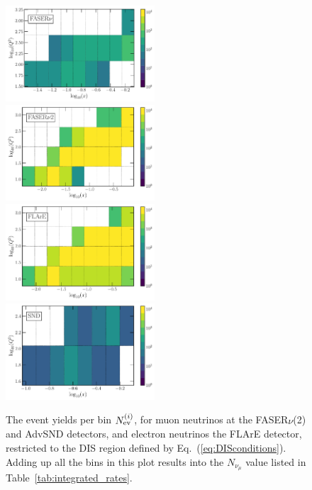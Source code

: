 \begin{figure}[t]
    \centering
	\includegraphics[width=0.495\textwidth]{plots/FPF-FASERv.pdf}
	\includegraphics[width=0.495\textwidth]{plots/FPF-FASERv2.pdf}
	\includegraphics[width=0.495\textwidth]{plots/FPF-FLArE100.pdf}
	\includegraphics[width=0.495\textwidth]{plots/FPF-SND.pdf}
	\caption{\small The event yields per bin $N_{\rm ev}^{(i)}$, for muon neutrinos at the FASER$\nu$(2)
	and AdvSND detectors, and electron neutrinos the FLArE detector, restricted to the DIS region defined 
	by Eq.~(\ref{eq:DISconditions}).
	Adding up all the bins in this plot results into the $N_{\nu_\mu}$ value listed in
	Table~\ref{tab:integrated_rates}.}
    \label{fig:fasernu2_muon}
\end{figure}

